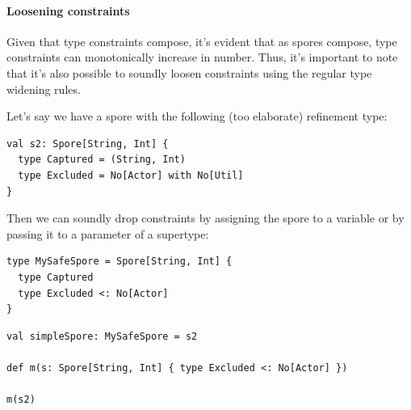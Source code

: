 \documentclass{llncs}
\begin{document}
\paragraph{\textbf{Loosening constraints}}

Given that type constraints compose, it's evident that as spores compose, type
constraints can monotonically increase in number. Thus, it's important to note
that it's also possible to soundly loosen constraints using the regular type
widening rules.

Let's say we have a spore with the following (too elaborate) refinement type:

\begin{lstlisting}
val s2: Spore[String, Int] {
  type Captured = (String, Int)
  type Excluded = No[Actor] with No[Util]
}
\end{lstlisting}

\noindent
Then we can soundly drop constraints by assigning the spore to a variable or by passing it to a parameter of a supertype:

\begin{lstlisting}
type MySafeSpore = Spore[String, Int] {
  type Captured
  type Excluded <: No[Actor]
}
\end{lstlisting}

\begin{lstlisting}
val simpleSpore: MySafeSpore = s2

def m(s: Spore[String, Int] { type Excluded <: No[Actor] })

m(s2)
\end{lstlisting}





\end{document}
